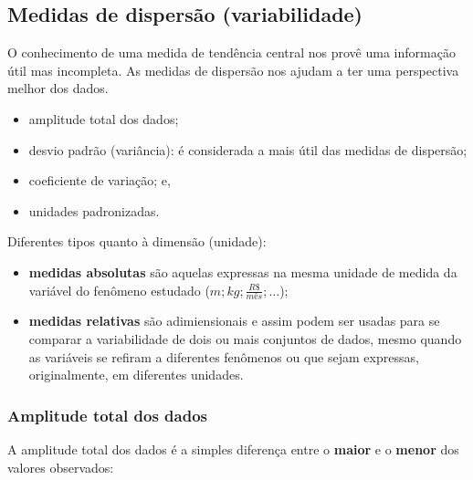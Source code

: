 \documentclass[
]{book}
\providecommand{\tightlist}{%
  \setlength{\itemsep}{0pt}\setlength{\parskip}{0pt}}
\begin{document}
\hypertarget{medidas-de-dispersuxe3o-variabilidade}{%
\subsection{Medidas de dispersão (variabilidade)}\label{medidas-de-dispersuxe3o-variabilidade}}

\hfill\break

O conhecimento de uma medida de tendência central nos provê uma informação útil mas incompleta. As medidas de dispersão nos ajudam a ter uma perspectiva melhor dos dados.

\hfill\break

\begin{itemize}
\tightlist
\item
  amplitude total dos dados;
\item
  desvio padrão (variância): é considerada a mais útil das medidas de dispersão;\\
\item
  coeficiente de variação; e,
\item
  unidades padronizadas.
\end{itemize}

\hfill\break

Diferentes tipos quanto à dimensão (unidade):

\hfill\break

\begin{itemize}
\tightlist
\item
  \textbf{medidas absolutas} são aquelas expressas na mesma unidade de medida da variável do fenômeno estudado (\(m;kg;\frac{R\$}{mês};\dots\));\\
\item
  \textbf{medidas relativas} são adimiensionais e assim podem ser usadas para se comparar a variabilidade de dois ou mais conjuntos de dados, mesmo quando as variáveis se refiram a diferentes fenômenos ou que sejam expressas, originalmente, em diferentes unidades.
\end{itemize}

\hfill\break

\hypertarget{amplitude-total-dos-dados}{%
\subsubsection{Amplitude total dos dados}\label{amplitude-total-dos-dados}}

\hfill\break

A amplitude total dos dados é a simples diferença entre o \textbf{maior} e o \textbf{menor} dos valores observados:
\end{document}
